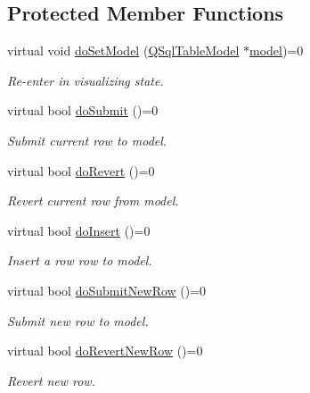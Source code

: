 \subsection*{Protected Member Functions}
\begin{DoxyCompactItemize}
\item 
virtual void \hyperlink{classmdt_abstract_sql_widget_aad8608a92f65790c99ca7897fbd48c30}{do\-Set\-Model} (\hyperlink{class_q_sql_table_model}{Q\-Sql\-Table\-Model} $\ast$\hyperlink{classmdt_abstract_sql_widget_a298d40a6540aeabbb7644e3c4fd9f3ea}{model})=0
\begin{DoxyCompactList}\small\item\em Re-\/enter in visualizing state. \end{DoxyCompactList}\item 
virtual bool \hyperlink{classmdt_abstract_sql_widget_a7a97e9c9f3b9c22650e4b55d095543ef}{do\-Submit} ()=0
\begin{DoxyCompactList}\small\item\em Submit current row to model. \end{DoxyCompactList}\item 
virtual bool \hyperlink{classmdt_abstract_sql_widget_a2c0cbbcd02be19767e68153ecbc2392d}{do\-Revert} ()=0
\begin{DoxyCompactList}\small\item\em Revert current row from model. \end{DoxyCompactList}\item 
virtual bool \hyperlink{classmdt_abstract_sql_widget_aa79059c092c6bcda569ced7c0621a817}{do\-Insert} ()=0
\begin{DoxyCompactList}\small\item\em Insert a row row to model. \end{DoxyCompactList}\item 
virtual bool \hyperlink{classmdt_abstract_sql_widget_ac546802e2910fc49c007eda5dbb3b3f7}{do\-Submit\-New\-Row} ()=0
\begin{DoxyCompactList}\small\item\em Submit new row to model. \end{DoxyCompactList}\item 
virtual bool \hyperlink{classmdt_abstract_sql_widget_a048efd5f89be7c6e74d6988b7e95fc07}{do\-Revert\-New\-Row} ()=0
\begin{DoxyCompactList}\small\item\em Revert new row. \end{DoxyCompactList}\item 

\end{DoxyCompactItemize}
